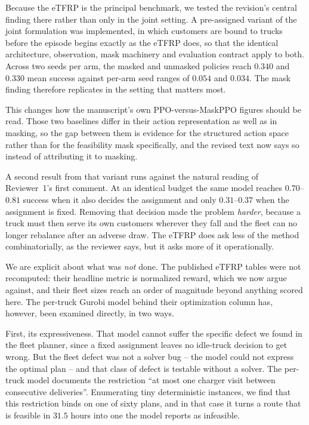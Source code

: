 \documentclass[11pt]{article}
\begin{document}
Because the eTFRP is the principal benchmark, we tested the revision's central
finding there rather than only in the joint setting. A pre-assigned variant of
the joint formulation was implemented, in which customers are bound to trucks
before the episode begins exactly as the eTFRP does, so that the identical
architecture, observation, mask machinery and evaluation contract apply to
both. Across two seeds per arm, the masked and unmasked policies reach $0.340$
and $0.330$ mean success against per-arm seed ranges of $0.054$ and $0.034$.
The mask finding therefore replicates in the setting that matters most.

This changes how the manuscript's own PPO-versus-MaskPPO figures should be
read. Those two baselines differ in their action representation as well as in
masking, so the gap between them is evidence for the structured action space
rather than for the feasibility mask specifically, and the revised text now
says so instead of attributing it to masking.

A second result from that variant runs against the natural reading of
Reviewer~1's first comment. At an identical budget the same model reaches
$0.70$--$0.81$ success when it also decides the assignment and only
$0.31$--$0.37$ when the assignment is fixed. Removing that decision made the
problem \emph{harder}, because a truck must then serve its own customers
wherever they fall and the fleet can no longer rebalance after an adverse draw.
The eTFRP does ask less of the method combinatorially, as the reviewer says,
but it asks more of it operationally.

We are explicit about what was \emph{not} done. The published eTFRP tables were
not recomputed: their headline metric is normalized reward, which we now argue
against, and their fleet sizes reach an order of magnitude beyond anything
scored here. The per-truck Gurobi model behind their optimization column has,
however, been examined directly, in two ways.

First, its expressiveness. That model cannot suffer the specific defect we found
in the fleet planner, since a fixed assignment leaves no idle-truck decision to
get wrong. But the fleet defect was not a solver bug -- the model could not
express the optimal plan -- and that class of defect is testable without a
solver. The per-truck model documents the restriction ``at most one charger
visit between consecutive deliveries''. Enumerating tiny deterministic
instances, we find that this restriction binds on one of sixty plans, and in
that case it turns a route that is feasible in $31.5$ hours into one the model
reports as infeasible.
\end{document}
